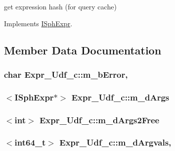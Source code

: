 get expression hash (for query cache) 



Implements \hyperlink{structISphExpr_aabc4c95ac6f190f6ebb15fabd7e54b08}{I\-Sph\-Expr}.



\subsection{Member Data Documentation}
\hypertarget{classExpr__Udf__c_a39a12cdc45355828deaf2227fcd34c5f}{
\subsubsection[{m\-\_\-b\-Error}]{\setlength{\rightskip}{0pt plus 5cm}char Expr\-\_\-\-Udf\-\_\-c\-::m\-\_\-b\-Error\hspace{0.3cm}{\ttfamily [mutable]}, {\ttfamily [protected]}}}\label{classExpr__Udf__c_a39a12cdc45355828deaf2227fcd34c5f}
\hypertarget{classExpr__Udf__c_a44490c229e7f366912547c92c17ddf09}{
\subsubsection[{m\-\_\-d\-Args}]{$<${\bf I\-Sph\-Expr}$\ast$$>$ Expr\-\_\-\-Udf\-\_\-c\-::m\-\_\-d\-Args}}\label{classExpr__Udf__c_a44490c229e7f366912547c92c17ddf09}
\hypertarget{classExpr__Udf__c_ad726b861609818b07a4ea61eb9df041d}{
\subsubsection[{m\-\_\-d\-Args2\-Free}]{$<${\bf int}$>$ Expr\-\_\-\-Udf\-\_\-c\-::m\-\_\-d\-Args2\-Free}}\label{classExpr__Udf__c_ad726b861609818b07a4ea61eb9df041d}
\hypertarget{classExpr__Udf__c_a96e3f1c8beab1df306e54fbcaedc4429}{
\subsubsection[{m\-\_\-d\-Argvals}]{$<${\bf int64\-\_\-t}$>$ Expr\-\_\-\-Udf\-\_\-c\-::m\-\_\-d\-Argvals\hspace{0.3cm}{\ttfamily [mutable]}, {\ttfamily [protected]}}}\label{classExpr__Udf__c_a96e3f1c8beab1df306e54fbcaedc4429}
